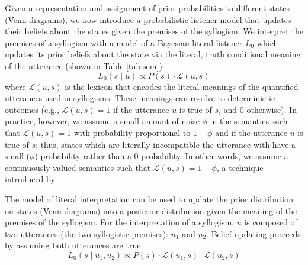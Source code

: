 \documentclass[floatsintext, doc]{apa6}
\begin{document}
Given a representation and assignment of prior probabilities to different states (Venn diagrams), we now introduce a probabilistic listener model that updates their beliefs about the states given the premises of the syllogism. 
We interpret the premises of a syllogism with a model of a Bayesian literal listener $L_0$ which updates its prior beliefs about the state via the literal, truth conditional meaning of the utterance (shown in Table \ref{tab:sem}):
\begin{equation}
L_0(s \mid u ) \propto P(s)\cdot \mathcal{L}(u, s) 
\label{eq:L0}
\end{equation}
\noindent where $\mathcal{L}(u, s)$ is the lexicon that encodes the literal meanings of the quantified utterances used in syllogisms. 
These meanings can resolve to deterministic outcomes (e.g., $\mathcal{L}(u, s) = 1$ if the utterance $u$ is true of $s$, and 0 otherwise). 
In practice, however, we assume a small amount of noise $\phi$ in the semantics such that $\mathcal{L}(u, s) = 1$ with probability proportional to $1-\phi$ and if the utterance $u$ is true of $s$; thus, states which are literally incompatible the utterance with have a small ($\phi$) probability rather than a 0 probability.
In other words, we assume a continuously valued semantics such that $\mathcal{L}(u, s) = 1-\phi$, a technique introduced by .


The model of literal interpretation can be used to update the prior distribution on states (Venn diagrams) into a posterior distribution given the meaning of the premises of the syllogism. 
For the interpretation of a syllogism, $u$ is composed of two utterances (the two syllogistic premises): $u_1$ and $u_2$. 
Belief updating proceeds by assuming both utterances are true: 
\begin{equation}
L_0(s \mid u_1,  u_2) \propto P(s)\cdot \mathcal{L}(u_1, s) \cdot \mathcal{L}(u_2, s) 
\label{eq:L0premises}
\end{equation}
\end{document}
